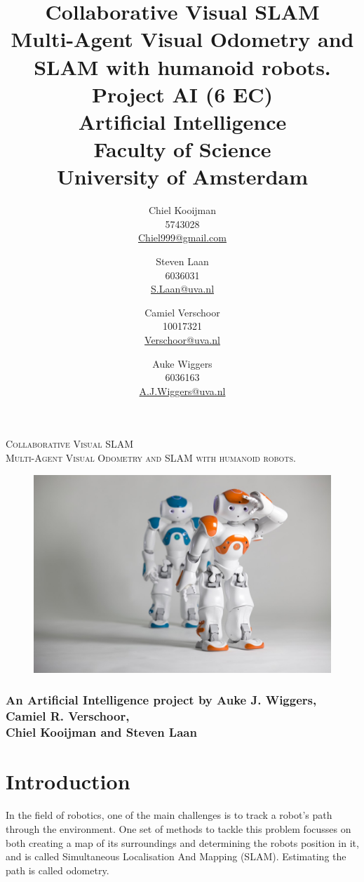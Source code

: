 \documentclass[a4paper]{article}
\author{Chiel Kooijman\\5743028\\\url{Chiel999@gmail.com} \and
Steven Laan\\6036031\\\url{S.Laan@uva.nl} \and
Camiel Verschoor\\10017321\\\url{Verschoor@uva.nl} \and
Auke Wiggers\\6036163\\\url{A.J.Wiggers@uva.nl}}
\title{Collaborative Visual SLAM\\
\normalsize Multi-Agent Visual Odometry and SLAM with humanoid robots.\\Project
AI (6 EC)\\Artificial Intelligence\\Faculty of Science\\
University of Amsterdam}
\begin{document}
\thispagestyle{empty}
\begin{center}
\Large\textsc{Collaborative Visual SLAM}\\
\normalsize\textsc{Multi-Agent Visual Odometry and SLAM with humanoid robots.}

\vspace{2cm}

\begin{figure}[!ht]
\centering
\includegraphics[width=\textwidth]{images/front.jpg}
\end{figure}

\subsubsection*{An Artificial Intelligence project by Auke J. Wiggers, Camiel
R. Verschoor,\\Chiel Kooijman and Steven Laan}
\end{center}

\newpage

\maketitle
\clearpage

\thispagestyle{empty}
\tableofcontents
\clearpage

\section{Introduction}
In the field of robotics, one of the main challenges is to track a robot's path
through the environment. One set of methods to tackle this problem focusses on
both creating a map of its surroundings and determining the robots position in
it, and is called Simultaneous Localisation And Mapping (SLAM). Estimating the
path is called odometry.
\end{document}
